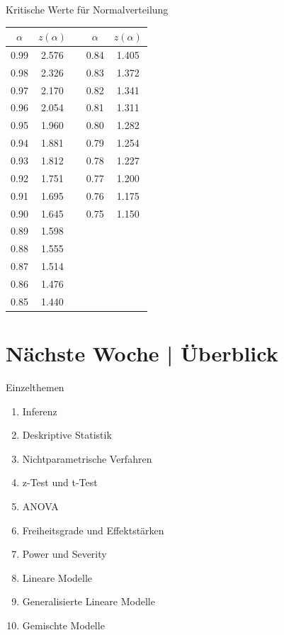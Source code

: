 \begin{frame}
  {Kritische Werte für Normalverteilung}
  \centering 
  \begin{tabular}[h]{ccp{}cc}
    \toprule
    \textbf{$\alpha$} & \textbf{$z(\alpha)$} && \textbf{$\alpha$} & \textbf{$z(\alpha)$}\\
    \midrule
    0.99 & 2.576 && 0.84 &  1.405 \\
    0.98 & 2.326 && 0.83 &  1.372 \\
    0.97 & 2.170 && 0.82 &  1.341 \\
    0.96 & 2.054 && 0.81 &  1.311 \\
    0.95 & 1.960 && 0.80 &  1.282 \\
    0.94 & 1.881 && 0.79 &  1.254 \\
    0.93 & 1.812 && 0.78 &  1.227 \\
    0.92 & 1.751 && 0.77 &  1.200 \\
    0.91 & 1.695 && 0.76 &  1.175 \\
    0.90 & 1.645 && 0.75 &  1.150 \\
    0.89 & 1.598 && & \\ 
    0.88 & 1.555 && & \\ 
    0.87 & 1.514 && & \\ 
    0.86 & 1.476 && & \\ 
    0.85 & 1.440 && & \\ 
    \bottomrule
  \end{tabular}
\end{frame}

\ifdefined\TITLE
  \section{Nächste Woche | Überblick}

  \begin{frame}
    {Einzelthemen}
    \begin{enumerate}
      \item Inferenz
      \item Deskriptive Statistik
      \item \alert{Nichtparametrische Verfahren}
      \item z-Test und t-Test
      \item ANOVA
      \item Freiheitsgrade und Effektstärken
      \item Power und Severity
      \item Lineare Modelle
      \item Generalisierte Lineare Modelle
      \item Gemischte Modelle
    \end{enumerate}
  \end{frame}
\fi
